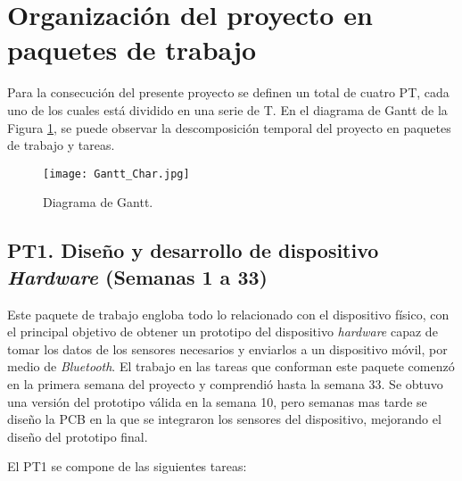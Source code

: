 \section{Organización del proyecto en paquetes de trabajo}

Para la consecución del presente proyecto se definen un total de cuatro \ac{PT}, cada uno de los cuales está dividido en una serie de \ac{T}. En el diagrama de Gantt de la Figura \ref{fig:gantt}, se puede observar la descomposición temporal del proyecto en paquetes de trabajo y tareas.

\begin{landscape}
\begin{figure}[!h]
\begin{center}
\texttt{[image: Gantt\_Char.jpg]}
\caption{Diagrama de Gantt.}
\label{fig:gantt}
\end{center}
\end{figure}
\end{landscape}

\subsection{\ac{PT}1. Diseño y desarrollo de dispositivo \textit{Hardware} (Semanas 1 a 33)}

Este paquete de trabajo engloba todo lo relacionado con el dispositivo físico, con el principal objetivo de obtener un prototipo del dispositivo \textit{hardware} capaz de tomar los datos de los sensores necesarios y enviarlos a un dispositivo móvil, por medio de \textit{Bluetooth}. El trabajo en las tareas que conforman este paquete comenzó en la primera semana del proyecto y comprendió hasta la semana 33. Se obtuvo una versión del prototipo válida en la semana 10, pero semanas mas tarde se diseño la \ac{PCB} en la que se integraron los sensores del dispositivo, mejorando el diseño del prototipo final. 

El \ac{PT}1 se compone de las siguientes tareas:


